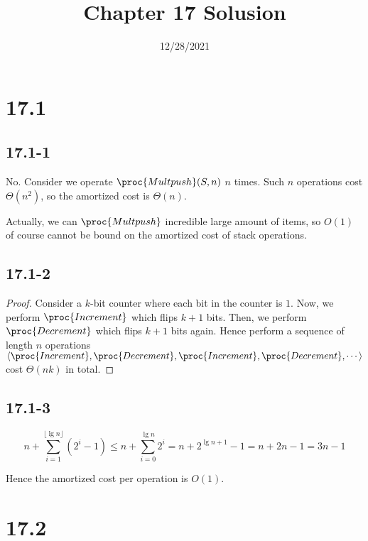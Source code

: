 

\title{Chapter 17 Solusion}
\date{12/28/2021}


\maketitle

\section*{17.1}

\subsection*{17.1-1}

No.
Consider we operate $\proc{Multpush}(S,n)$ $n$ times.
Such $n$ operations cost $\Theta(n^2)$, 
so the amortized cost is $\Theta(n)$.

Actually, we can $\proc{Multpush}$ incredible large amount of items,
so $O(1)$ of course cannot be bound on the amortized cost
of stack operations.

\subsection*{17.1-2}

\begin{proof}
    Consider a $k$-bit counter where each bit in the counter is $1$.
    Now, we perform $\proc{Increment}$ which flips $k+1$ bits.
    Then, we perform $\proc{Decrement}$ which flips $k+1$ bits again.
    Hence perform a sequence of length $n$ operations 
    $\langle \proc{Increment}, \proc{Decrement}, 
    \proc{Increment}, \proc{Decrement}, \cdots \rangle$
    cost $\Theta(nk)$ in total.
\end{proof}

\subsection*{17.1-3}

\begin{equation*}
    n + \sum\limits_{i = 1}^{\lfloor \lg n \rfloor} (2^i - 1)
    \leq n + \sum\limits_{i = 0}^{\lg n} 2^i
    = n + 2^{\lg n + 1} - 1 = n + 2n - 1 = 3n - 1
\end{equation*}

Hence the amortized cost per operation is $O(1)$.

\section*{17.2}

